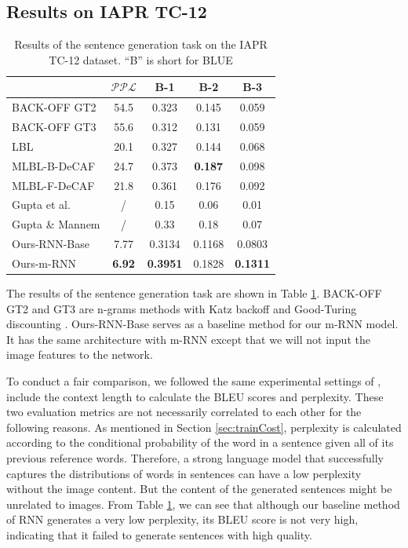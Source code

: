 \subsection{Results on IAPR TC-12}

\begin{table}[htb]
	\centering
\begin{tabular}{l|cccc}
\hline
      & $\mathcal{PPL}$  & B-1   & B-2   & B-3 \\
\hline
BACK-OFF GT2 & 54.5  & 0.323 & 0.145 & 0.059 \\
BACK-OFF GT3 & 55.6  & 0.312 & 0.131 & 0.059 \\
LBL \cite{mnih2007three}  & 20.1  & 0.327 & 0.144 & 0.068 \\
MLBL-B-DeCAF \cite{kiros2013multimodal} & 24.7  & 0.373 & \textbf{0.187} & 0.098 \\
MLBL-F-DeCAF \cite{kiros2013multimodal} & 21.8  & 0.361 & 0.176 & 0.092 \\
Gupta et al. \cite{gupta2012choosing} & /     & 0.15  & 0.06  & 0.01 \\
Gupta \& Mannem \cite{gupta2012image} & /     & 0.33  & 0.18  & 0.07 \\
\hdashline
Ours-RNN-Base & 7.77  & 0.3134 & 0.1168 & 0.0803 \\
Ours-m-RNN & \textbf{6.92} & \textbf{0.3951} & 0.1828 & \textbf{0.1311} \\
\hline
\end{tabular}%
	\caption{Results of the sentence generation task on the IAPR TC-12 dataset. ``B'' is short for BLUE}
	\label{tab:iaprtc_gen}
\end{table}

The results of the sentence generation task are shown in Table \ref{tab:iaprtc_gen}.
BACK-OFF GT2 and GT3 are n-grams methods with Katz backoff and Good-Turing discounting \cite{chen2000survey,kiros2013multimodal}.
Ours-RNN-Base serves as a baseline method for our m-RNN model.
It has the same architecture with m-RNN except that we will not input the image features to the network.

To conduct a fair comparison, we followed the same experimental settings of \cite{kiros2013multimodal}, include the context length to calculate the BLEU scores and perplexity.
These two evaluation metrics are not necessarily correlated to each other for the following reasons.
As mentioned in Section \ref{sec:trainCost}, perplexity is calculated according to the conditional probability of the word in a sentence given all of its previous reference words.
Therefore, a strong language model that successfully captures the distributions of words in sentences can have a low perplexity without the image content.
But the content of the generated sentences might be unrelated to images.
From Table \ref{tab:iaprtc_gen}, we can see that although our baseline method of RNN generates a very low perplexity, its BLEU score is not very high, indicating that it failed to generate sentences with high quality.

